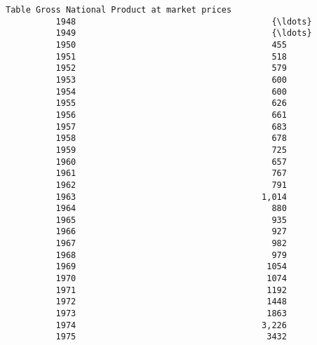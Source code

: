 \documentclass[11pt]{article}
\begin{document}
\begin{Verbatim}[commandchars=\\\{\}]
          Table Gross National Product at market prices   
          1948                                       {\ldots}  
          1949                                       {\ldots}  
          1950                                       455  
          1951                                       518  
          1952                                       579  
          1953                                       600  
          1954                                       600  
          1955                                       626  
          1956                                       661  
          1957                                       683  
          1958                                       678  
          1959                                       725  
          1960                                       657  
          1961                                       767  
          1962                                       791  
          1963                                     1,014  
          1964                                       880  
          1965                                       935  
          1966                                       927  
          1967                                       982  
          1968                                       979  
          1969                                      1054  
          1970                                      1074  
          1971                                      1192  
          1972                                      1448  
          1973                                      1863  
          1974                                     3,226  
          1975                                      3432  
\end{Verbatim}
            
\end{document}
